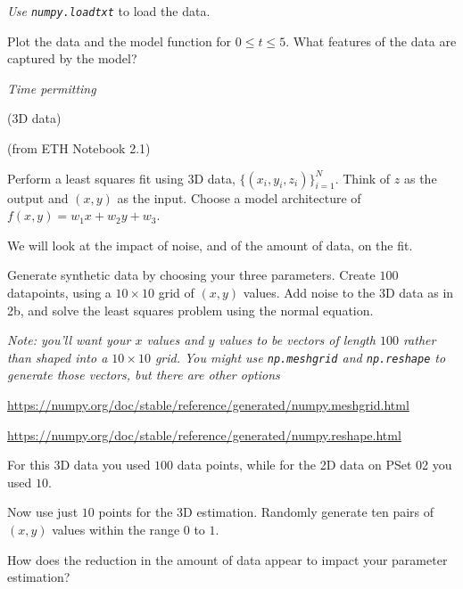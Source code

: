 \documentclass[12pt,letterpaper,noanswers]{exam}
\newcommand{\vc}[1]{\boldsymbol{#1}}
\begin{document}
\begin{questions}
\begin{parts}
\emph{Use \texttt{numpy.loadtxt}} to load the data.

\item Plot the data and the model function for $0\leq t\leq 5$.  What features of the data are captured by the model?
\end{parts}


\question \emph{Time permitting}

(3D data) 

(from ETH Notebook 2.1)

Perform a least squares fit using 3D data, $\{(x_i,y_i,z_i)\}_{i=1}^N$.  Think of $z$ as the output and $(x,y)$ as the input.  Choose a model architecture of $f(x,y) = w_1 x + w_2 y + w_3$.

We will look at the impact of noise, and of the amount of data, on the fit.

\begin{parts}
\item Generate synthetic data by choosing your three parameters.  Create $100$ datapoints, using a $10\times 10$ grid of $(x,y)$ values.  Add noise to the 3D data as in 2b, and solve the least squares problem using the normal equation.

\emph{Note: you'll want your $x$ values and $y$ values to be vectors of length $100$ rather than shaped into a $10\times 10$ grid.  You might use \texttt{np.meshgrid} and \texttt{np.reshape} to generate those vectors, but there are other options}  %

\url{https://numpy.org/doc/stable/reference/generated/numpy.meshgrid.html}

\url{https://numpy.org/doc/stable/reference/generated/numpy.reshape.html}

\item For this 3D data you used $100$ data points, while for the 2D data on PSet 02 you used $10$.

Now use just $10$ points for the 3D estimation.  Randomly generate ten pairs of $(x,y)$ values within the range $0$ to $1$.

How does the reduction in the amount of data appear to impact your parameter estimation?
\end{parts}









\end{questions}
  
\end{document}
